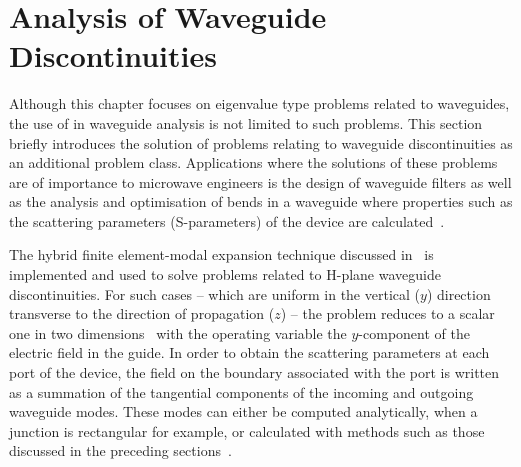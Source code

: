 \section{Analysis of Waveguide Discontinuities}
\label{lezar:sec:waveguide_discontinuities}

Although this chapter focuses on eigenvalue type problems related to
waveguides, the use of \fenics{} in waveguide analysis is not limited
to such problems. This section briefly introduces the solution of
problems relating to waveguide discontinuities as an additional
problem class. Applications where the solutions of these problems are
of importance to microwave engineers is the design of waveguide
filters as well as the analysis and optimisation of bends in a
waveguide where properties such as the scattering parameters
(S-parameters) of the device are
calculated~\cite{Poz2005}.

The hybrid finite element-modal expansion technique discussed
in~\cite{PelCoc1998} is implemented and used to solve problems related
to H-plane waveguide discontinuities. For such cases -- which are
uniform in the vertical ($y$) direction transverse to the direction of
propagation ($z$) -- the problem reduces to a scalar one in two
dimensions~\cite{Jin2002} with the operating variable the
$y$-component of the electric field in the guide. In order to obtain
the scattering parameters at each port of the device, the field on the
boundary associated with the port is written as a summation of the
tangential components of the incoming and outgoing waveguide
modes. These modes can either be computed analytically, when a
junction is rectangular for example, or calculated with methods such
as those discussed in the preceding sections~\cite{MarPel2003}.

